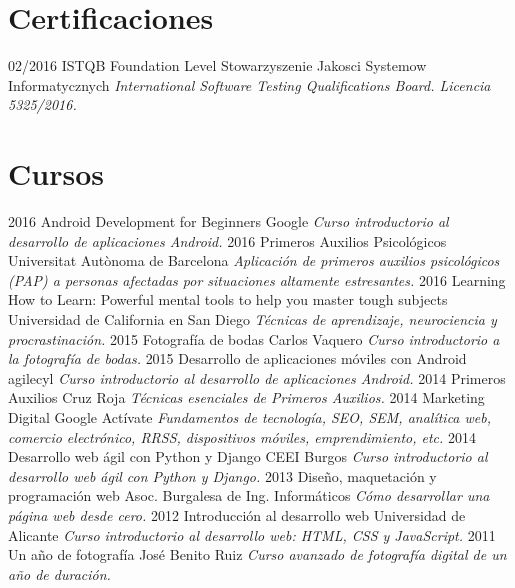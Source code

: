 \documentclass[]{friggeri-cv}
\begin{document}
\section{Certificaciones}
\begin{entrylist}
  \entry
    {02/2016}
    {ISTQB Foundation Level}
    {Stowarzyszenie Jakosci Systemow Informatycznych}
    {\emph{International Software Testing Qualifications Board. Licencia 5325/2016.}}
\end{entrylist}

\section{Cursos}
\begin{entrylist}
  \entry
    {2016}
    {Android Development for Beginners}
    {Google}
    {\emph{Curso introductorio al desarrollo de aplicaciones Android.}}
  \entry
    {2016}
    {Primeros Auxilios Psicológicos}
    {Universitat Autònoma de Barcelona}
    {\emph{Aplicación de primeros auxilios psicológicos (PAP) a personas afectadas por situaciones altamente estresantes.}}
  \entry
    {2016}
    {Learning How to Learn: Powerful mental tools to help you master tough subjects}
    {Universidad de California en San Diego}
    {\emph{Técnicas de aprendizaje, neurociencia y procrastinación.}}
  \entry
    {2015}
    {Fotografía de bodas}
    {Carlos Vaquero}
    {\emph{Curso introductorio a la fotografía de bodas.}}
  \entry
    {2015}
    {Desarrollo de aplicaciones móviles con Android}
    {agilecyl}
    {\emph{Curso introductorio al desarrollo de aplicaciones Android.}}
  \entry
    {2014}
    {Primeros Auxilios}
    {Cruz Roja}
    {\emph{Técnicas esenciales de Primeros Auxilios.}}
  \entry
    {2014}
    {Marketing Digital}
    {Google Actívate} 
    {\emph{Fundamentos de tecnología, SEO, SEM, analítica web, comercio electrónico, RRSS, dispositivos móviles, emprendimiento, etc.}}
  \entry
    {2014}
    {Desarrollo web ágil con Python y Django}
    {CEEI Burgos} 
    {\emph{Curso introductorio al desarrollo web ágil con Python y Django.}}    
  \entry
    {2013}
    {Diseño, maquetación y programación web}
    {Asoc. Burgalesa de Ing. Informáticos}   
    {\emph{Cómo desarrollar una página web desde cero.}}     
  \entry
    {2012}
    {Introducción al desarrollo web}
    {Universidad de Alicante}  
    {\emph{Curso introductorio al desarrollo web: HTML, CSS y JavaScript.}}     
  \entry
    {2011}
    {Un año de fotografía}
    {José Benito Ruiz}    
    {\emph{Curso avanzado de fotografía digital de un año de duración.}}      
\end{entrylist}
\end{document}
